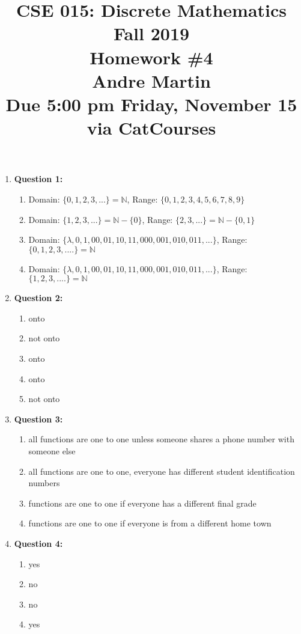 \documentclass[11pt]{article}
\begin{document}
\title{\vspace{-1.5cm}CSE 015: Discrete Mathematics\\
Fall 2019\\
Homework \#4\\
Andre Martin\\
Due 5:00 pm Friday, November 15 via CatCourses}
\date{}
\maketitle

\vspace{-1.5cm}

\begin{enumerate}
\item
\textbf{Question 1:}
\begin{enumerate}[label=(\alph*)]

\item Domain: $ \{0,1,2,3,...\} = \mathbb{N} $, Range: $\{0,1,2,3,4,5,6,7,8,9\}$
\item Domain: $ \{1,2,3,...\} = \mathbb{N} - \{0\} $, Range: $\{2,3,...\} = \mathbb{N} - \{0,1\}$
\item Domain: $ \{\lambda,0,1,00,01,10,11,000,001,010,011,...\}$, Range: $\{0,1,2,3,....\} = \mathbb{N}$
\item Domain: $ \{\lambda,0,1,00,01,10,11,000,001,010,011,...\}$, Range: $\{1,2,3,....\} = \mathbb{N}$
\end{enumerate}

\item
\textbf{Question 2:}
\begin{enumerate}[label=(\alph*)]

\item onto
\item not onto
\item onto
\item onto
\item not onto
\end{enumerate}

\item
\textbf{Question 3:}
\begin{enumerate}[label=(\alph*)]

\item all functions are one to one unless someone shares a phone number with someone else
\item all functions are one to one, everyone has different student identification numbers
\item functions are one to one if everyone has a different final grade
\item functions are one to one if everyone is from a different home town
\end{enumerate}

\item
\textbf{Question 4:}
\begin{enumerate}[label=(\alph*)]

\item yes
\item no
\item no
\item yes
\end{enumerate}

\end{enumerate}
\end{document}
